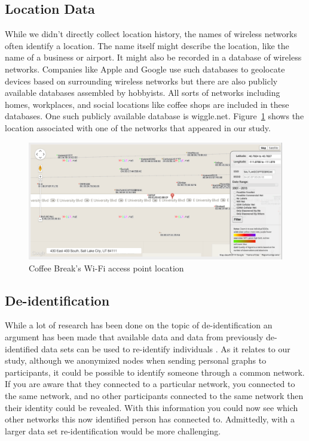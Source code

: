 \documentclass[letterpaper,twocolumn,10pt]{article}
\begin{document}
\subsection{Location Data}
While we didn't directly collect location history, the names of wireless networks often identify a location. The name itself might describe the location, like the name of a business or airport. It might also be recorded in a database of wireless networks. Companies like Apple and Google use such databases to geolocate devices based on surrounding wireless networks but there are also publicly available databases assembled by hobbyists. All sorts of networks including homes, workplaces, and social locations like coffee shops are included in these databases. One such publicly available database is wiggle.net. Figure~\ref{wiggle} shows the location associated with one of the networks that appeared in our study.

\begin{figure}
\centering
\includegraphics[scale=.43]{wigle}
\caption{\textsf{Coffee Break's Wi-Fi access point location}}
\label{wiggle}
\end{figure}




\subsection{De-identification}
While a lot of research has been done on the topic of de-identification an argument 
has been made that available data and data from previously de-identified data sets 
can be used to re-identify individuals \cite{narayanan}.  As it relates to our study, 
although we anonymized nodes when sending personal graphs to participants, it could be possible
to identify someone through a common network.  If you are aware that they connected to a
particular network, you connected to the same network, and no other participants connected to
the same network then their identity could be revealed. With this information you could now see 
which other networks this now identified person has connected to. Admittedly, with a larger 
data set re-identification would be more challenging. 
\end{document}
